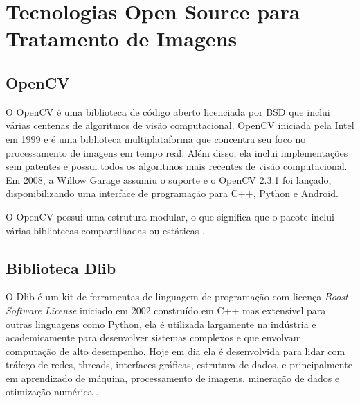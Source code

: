 
%	

\section{Tecnologias Open Source para Tratamento de Imagens}

\subsection{OpenCV}
O OpenCV é uma biblioteca de código aberto licenciada por BSD que inclui várias centenas de algoritmos de visão computacional.
OpenCV iniciada pela Intel em 1999 e é uma biblioteca multiplataforma que concentra seu foco no processamento de imagens em tempo real. Além disso, ela inclui implementações sem patentes e possui todos os algoritmos mais recentes de visão computacional. Em 2008, a Willow Garage assumiu o suporte e o OpenCV 2.3.1 foi lançado, disponibilizando uma interface de programação para C++, Python e Android.

O OpenCV possui uma estrutura modular, o que significa que o pacote inclui várias bibliotecas compartilhadas ou estáticas \cite{doze}.
\subsection{Biblioteca Dlib}
O Dlib é um kit de ferramentas de linguagem de programação com licença \textit{Boost Software License} iniciado em 2002 construído em C++ mas extensível para outras linguagens como Python, ela é utilizada largamente na indústria e academicamente para desenvolver sistemas complexos e que envolvam computação de alto desempenho. Hoje em dia ela é desenvolvida para lidar com tráfego de redes, threads, interfaces gráficas, estrutura de dados, e principalmente em aprendizado de máquina, processamento de imagens, mineração de dados e otimização numérica \cite{vintesete}.

